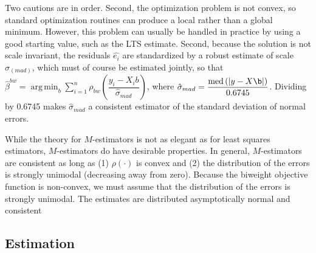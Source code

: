 \documentclass[12pt]{article}
\DeclareMathOperator*{\argmin}{arg\,min}
\DeclareMathOperator{\med}{med}
\begin{document}
Two cautions are in order. Second, the optimization problem is not convex, so standard optimization routines can produce a local rather than a global minimum. However, this problem can usually be handled in practice by using a good starting value, such as the LTS estimate. Second, because the solution is not scale invariant, the residuals $\hat{e_i}$ are standardized by a robust estimate of scale $\hat{\sigma}_{(mad)}$, which must of course be estimated jointly, so that $\hat{\beta}^{bw} =\argmin_{b} \sum_{i = 1}^n \rho_{bw}\left(\dfrac{y_i - X_ib}{\hat{\sigma}_{mad}}\right)$, where $\hat{\sigma}_{mad} = \dfrac{\med\left( |y - X\b|\right)}{0.6745}$. Dividing by 0.6745 makes $\hat{\sigma}_{mad}$ a consistent estimator of the standard deviation of normal errors.

While the theory for $M$-estimators is not as elegant as for least squares estimators, $M$-estimators do have desirable properties. In general, $M$-estimators are consistent as long as (1) $\rho(\cdot)$ is convex and (2) the distribution of the errors is strongly unimodal (decreasing away from zero). Because the biweight objective function is non-convex, we must assume that the distribution of the errors is strongly unimodal. The estimates are distributed asymptotically normal and consistent 

\subsection*{Estimation}
\end{document}
